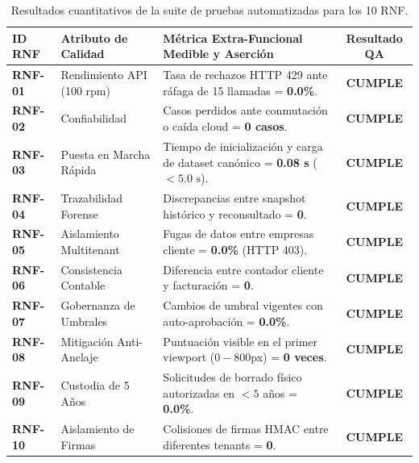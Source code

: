\documentclass[11pt,letterpaper]{article}
\begin{document}
\begin{table}[h]
\centering
\small
\begin{tabularx}{\textwidth}{l P{3.8cm} Y c}
\toprule
\textbf{ID RNF} & \textbf{Atributo de Calidad} & \textbf{Métrica Extra-Funcional Medible y Aserción} & \textbf{Resultado QA} \\
\midrule
\textbf{RNF-01} & Rendimiento API (100 rpm) & Tasa de rechazos HTTP 429 ante ráfaga de 15 llamadas = \textbf{0.0\%}. & \textbf{CUMPLE} \\
\textbf{RNF-02} & Confiabilidad & Casos perdidos ante conmutación o caída cloud = \textbf{0 casos}. & \textbf{CUMPLE} \\
\textbf{RNF-03} & Puesta en Marcha Rápida & Tiempo de inicialización y carga de dataset canónico = \textbf{0.08 s} ($< 5.0\text{ s}$). & \textbf{CUMPLE} \\
\textbf{RNF-04} & Trazabilidad Forense & Discrepancias entre snapshot histórico y reconsultado = \textbf{0}. & \textbf{CUMPLE} \\
\textbf{RNF-05} & Aislamiento Multitenant & Fugas de datos entre empresas cliente = \textbf{0.0\%} (HTTP 403). & \textbf{CUMPLE} \\
\textbf{RNF-06} & Consistencia Contable & Diferencia entre contador cliente y facturación = \textbf{0}. & \textbf{CUMPLE} \\
\textbf{RNF-07} & Gobernanza de Umbrales & Cambios de umbral vigentes con auto-aprobación = \textbf{0.0\%}. & \textbf{CUMPLE} \\
\textbf{RNF-08} & Mitigación Anti-Anclaje & Puntuación visible en el primer viewport ($0-800$px) = \textbf{0 veces}. & \textbf{CUMPLE} \\
\textbf{RNF-09} & Custodia de 5 Años & Solicitudes de borrado físico autorizadas en $<5$ años = \textbf{0.0\%}. & \textbf{CUMPLE} \\
\textbf{RNF-10} & Aislamiento de Firmas & Colisiones de firmas HMAC entre diferentes tenants = \textbf{0}. & \textbf{CUMPLE} \\
\bottomrule
\end{tabularx}
\caption{Resultados cuantitativos de la suite de pruebas automatizadas para los 10 RNF.}
\label{tab:rnf-results}
\end{table}
\end{document}
